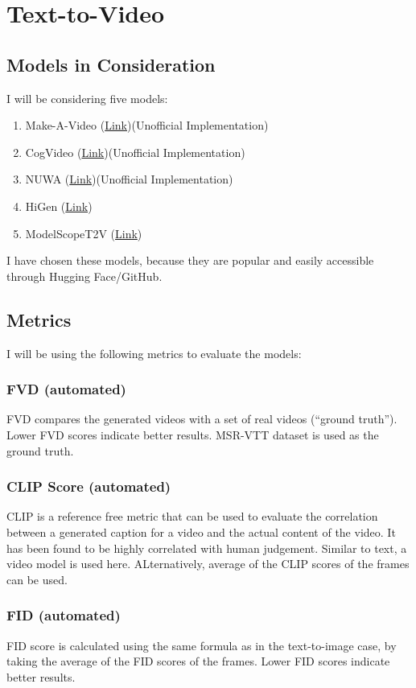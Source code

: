 \documentclass[12pt]{article}
\begin{document}
\section{Text-to-Video}
\subsection{Models in Consideration}
I will be considering five models:
\begin{enumerate}
  \item  Make-A-Video (\href{https://github.com/lucidrains/make-a-video-pytorch}{Link})\quad (Unofficial Implementation)
  \item  CogVideo (\href{https://github.com/lucidrains/make-a-video-pytorch}{Link})\quad (Unofficial Implementation)
  \item  NUWA (\href{https://github.com/lucidrains/nuwa-pytorch}{Link})\quad (Unofficial Implementation)
  \item HiGen (\href{https://github.com/ali-vilab/VGen}{Link})
  \item ModelScopeT2V (\href{https://github.com/exponentialml/text-to-video-finetuning}{Link})
\end{enumerate}
I have chosen these models, because they are popular and easily accessible through Hugging Face/GitHub.
\subsection{Metrics}
I will be using the following metrics to evaluate the models:
\subsubsection{FVD (automated)}
FVD compares the generated videos with a set of real videos (``ground truth''). Lower FVD scores indicate better results. MSR-VTT dataset is used as the ground truth.
\subsubsection{CLIP Score (automated)}
CLIP is a reference free metric that can be used to evaluate the correlation between a generated caption for a video and the actual content of the video. It has been found to be highly correlated with human judgement. Similar to text, a video model is used here. ALternatively, average of the CLIP scores of the frames can be used.
\subsubsection{FID (automated)}
FID score is calculated using the same formula as in the text-to-image case, by taking the average of the FID scores of the frames. Lower FID scores indicate better results.
\end{document}
